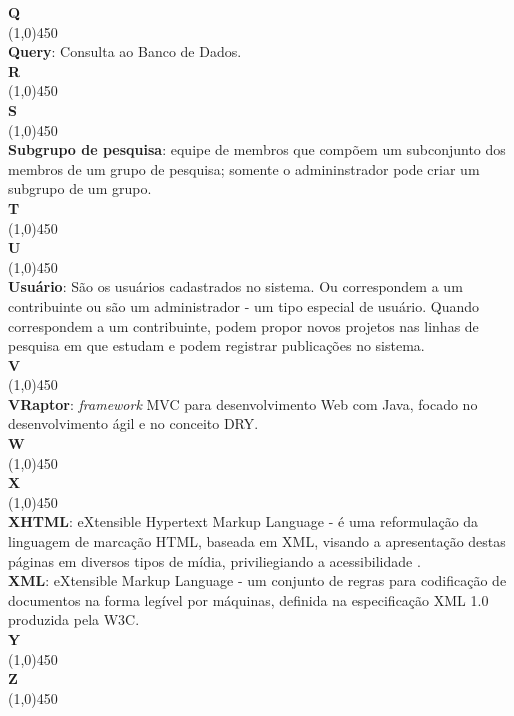 \documentclass[11pt, a4paper]{article}
\begin{document}
	\noindent\textbf{\huge{Q}}\\
	\line(1,0){450}\\
	\textbf{Query}: Consulta ao Banco de Dados.\\
	
	\noindent\textbf{\huge{R}}\\
	\line(1,0){450}\\
	
	\noindent\textbf{\huge{S}}\\
	\line(1,0){450}\\
	\textbf{Subgrupo de pesquisa}: equipe de membros que compõem um subconjunto dos membros de um grupo de 
	pesquisa; somente o admininstrador pode criar um subgrupo de um grupo.\\
		
	\noindent\textbf{\huge{T}}\\
	\line(1,0){450}\\
		
	\noindent\textbf{\huge{U}}\\
	\line(1,0){450}\\
	\textbf{Usuário}: São os usuários cadastrados no sistema. Ou correspondem a um contribuinte
	ou são um administrador - um tipo especial de usuário. Quando correspondem a um contribuinte,
	podem propor novos projetos nas linhas de pesquisa em que estudam e podem registrar publicações
	no sistema.\\
		
	\noindent\textbf{\huge{V}}\\
	\line(1,0){450}\\
	\textbf{VRaptor}: \emph{framework} MVC para desenvolvimento Web com Java, focado no
	desenvolvimento ágil e no conceito DRY.\\
	
	\noindent\textbf{\huge{W}}\\
	\line(1,0){450}\\
		
	\noindent\textbf{\huge{X}}\\
	\line(1,0){450}\\
	\textbf{XHTML}: eXtensible Hypertext Markup Language - é uma reformulação 
	da linguagem de marcação HTML, baseada em XML, visando a apresentação destas páginas em diversos tipos de mídia, priviliegiando a acessibilidade .\\
	\textbf{XML}: eXtensible Markup Language - um conjunto de regras para codificação de documentos na forma legível por máquinas, definida na especificação XML 1.0 produzida pela W3C.\\
	
	\noindent\textbf{\huge{Y}}\\
	\line(1,0){450}\\
		
	\noindent\textbf{\huge{Z}}\\
	\line(1,0){450}\\
	
\end{document}
